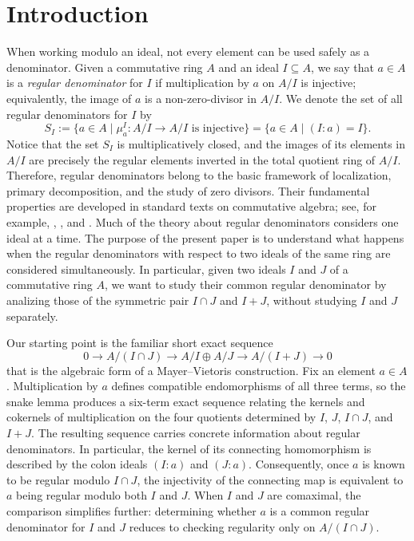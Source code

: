 \documentclass[11pt,leqno]{amsart}
\theoremstyle{definition}
\numberwithin{equation}{section}
\begin{document}
\section{Introduction}
When working modulo an ideal, not every element can be used safely as a denominator. Given a commutative ring $A$ and an ideal $I\subseteq A$, we say that $a\in A$ is a \emph{regular denominator} for $I$ if multiplication by $a$ on $A/I$ is injective; equivalently, the image of $a$ is a non-zero-divisor in $A/I$. We denote the set of all regular denominators for $I$ by
\[
S_I
:=\{a\in A\mid \mu_a^I\colon A/I\to A/I
\text{ is injective}\}
=\{a\in A\mid(I:a)=I\}.
\]
Notice that the set $S_I$ is multiplicatively closed, and the images of its elements in $A/I$ are precisely the regular elements inverted in the total quotient ring of $A/I$. Therefore, regular denominators belong to the basic framework of localization, primary decomposition, and the study of zero divisors. Their fundamental properties are developed in standard texts on commutative algebra; see, for example, \cite{AM69}, \cite{Eis95}, and \cite{Mat86}. Much of the theory about regular denominators considers one ideal at a time. The purpose of the present paper is to understand what happens when the regular denominators with respect to two ideals  of the same ring are considered simultaneously. In particular, given two ideals $I$ and $J$ of a commutative ring $A$, we want to study their common regular denominator by analizing those of the symmetric pair $I\cap J$ and $I+J$, without studying $I$ and $J$ separately.

Our starting point is the familiar short exact sequence
$$
0\longrightarrow A/(I\cap J)\longrightarrow A/I\oplus A/J
\longrightarrow A/(I+J)\longrightarrow 0
$$
that is the algebraic form of a Mayer--Vietoris construction. Fix an element $a\in A$. Multiplication by $a$ defines compatible endomorphisms of all three terms, so the snake lemma produces a six-term exact sequence relating the kernels and cokernels of multiplication on the four quotients determined by $I$, $J$, $I\cap J$, and $I+J$.
The resulting sequence carries concrete information about regular denominators. In particular, the kernel of its connecting homomorphism is described by the colon ideals $(I:a)$ and $(J:a)$. Consequently, once $a$ is known to be regular modulo $I\cap J$, the injectivity of the connecting map is equivalent to $a$ being regular modulo both $I$ and $J$. When $I$ and $J$ are comaximal, the comparison simplifies further: determining whether $a$ is a common regular denominator for $I$ and $J$ reduces to checking regularity only on $A/(I\cap J)$.
\end{document}
